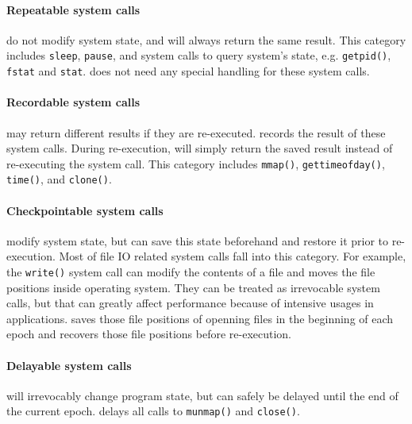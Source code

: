 \label{sec:syscalls}
\paragraph{Repeatable system calls} do not modify system state, and will always return the same result.
This category includes \texttt{sleep}, \texttt{pause}, and system calls to query system's state, e.g. \texttt{getpid()}, \texttt{fstat} and \texttt{stat}. 
\doubletake{} does not need any special handling for these system calls.
	
\paragraph{Recordable system calls} may return different results if they are re-executed. 
\doubletake{} records the result of these system calls. 
During re-execution, \doubletake{} will simply return the saved result 
instead of re-executing the system call. 
This category includes \texttt{mmap()}, \texttt{gettimeofday()}, \texttt{time()}, and \texttt{clone()}.

\paragraph{Checkpointable system calls} modify system state, 
but \doubletake{} can save this state beforehand and restore it prior to re-execution. 
Most of file IO related system calls fall into this category. 
For example, the \texttt{write()} system call can modify the contents of a file and moves the 
file positions inside operating system.
They can be treated as irrevocable system calls, but that can greatly affect performance 
because of intensive usages in applications.
\doubletake{} saves those file positions of openning files in the beginning of each epoch and 
recovers those file positions before re-execution. 
	
\paragraph{Delayable system calls} will irrevocably change program state, but can safely 
be delayed until the end of the current epoch. 
\doubletake{} delays all calls to \texttt{munmap()} and \texttt{close()}.
	
